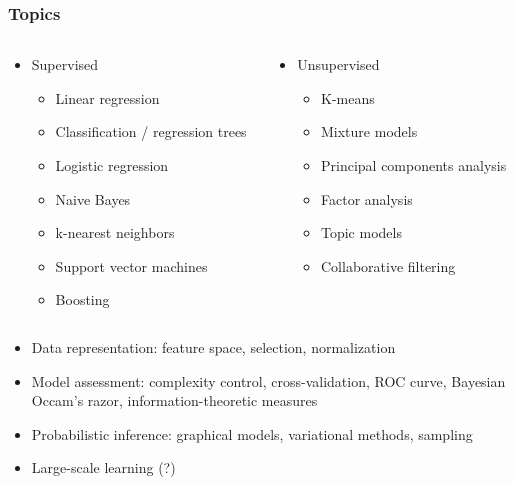 \begin{frame}
  \frametitle{Topics}

  \begin{columns}[t]
    \begin{column}{0.5\textwidth}

      \begin{itemize}
      \item Supervised
        \begin{itemize}
          \item Linear regression
          \item Classification / regression trees
          \item Logistic regression
          \item Naive Bayes
          \item k-nearest neighbors
          \item Support vector machines
          \item Boosting
        \end{itemize}
      \end{itemize}

    \end{column}
    \begin{column}{0.5\textwidth}

      \begin{itemize}
      \item Unsupervised
        \begin{itemize}
          \item K-means
          \item Mixture models
          \item Principal components analysis
          \item Factor analysis
          \item Topic models
          \item Collaborative filtering
        \end{itemize}
      \end{itemize}

    \end{column}
  \end{columns}

  \pause
  \begin{itemize}
    \item Data representation: feature space, selection, normalization
    \item Model assessment: complexity control, cross-validation, ROC curve, Bayesian Occam's razor, information-theoretic measures
    \pause
    \item Probabilistic inference: graphical models, variational methods, sampling
    \item Large-scale learning (?)
  \end{itemize}

\end{frame}

